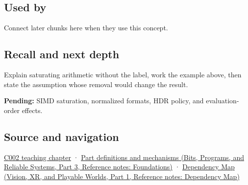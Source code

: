 \subsection{Used by}\label{appendix-3999c6209649-used-by}

\hypertarget{appendix-3999c6209649-used-by}{}

Connect later chunks here when they use this concept.

\subsection{Recall and next depth}\label{appendix-3999c6209649-recall-and-next-depth}

\hypertarget{appendix-3999c6209649-recall-and-next-depth}{}

Explain saturating arithmetic without the label, work the example above, then state the assumption whose removal would change the result.

\textbf{Pending:} SIMD saturation, normalized formats, HDR policy, and evaluation-order effects.

\subsection{Source and navigation}\label{appendix-3999c6209649-source-and-navigation}

\hypertarget{appendix-3999c6209649-source-and-navigation}{}

\hyperref[01-foundations-i-ch001-arithmetic-becomes-a-policy]{C002 teaching chapter} · \href{../01-Bits-Programs-and-Reliable-Systems-P03/main.pdf\#appendix-fd090d982a15}{Part definitions and mechanisms (Bits, Programs, and Reliable Systems, Part 3, Reference notes: Foundations)} · \href{../07-Vision-XR-and-Playable-Worlds-P01/main.pdf\#appendix-4ad47bdd269a}{Dependency Map (Vision, XR, and Playable Worlds, Part 1, Reference notes: Dependency Map)}
